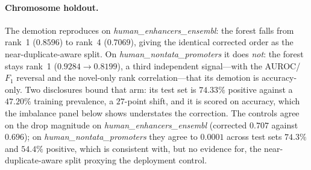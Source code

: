 \documentclass[11pt,a4paper]{article}
\begin{document}
\paragraph{Chromosome holdout.} The demotion reproduces on \textit{human\_enhancers\_ensembl}: the forest falls from rank~1 ($0.8596$) to rank~4 ($0.7069$), giving the identical corrected order as the near-duplicate-aware split. On \textit{human\_nontata\_promoters} it does \emph{not}: the forest stays rank~1 ($0.9284\to0.8199$), a third independent signal---with the AUROC/$F_1$ reversal and the novel-only rank correlation---that its demotion is accuracy-only. Two disclosures bound that arm: its test set is $74.33\%$ positive against a $47.20\%$ training prevalence, a $27$-point shift, and it is scored on accuracy, which the imbalance panel below shows understates the correction. The controls agree on the drop magnitude on \textit{human\_enhancers\_ensembl} (corrected $0.707$ against $0.696$); on \textit{human\_nontata\_promoters} they agree to $0.0001$ across test sets $74.3\%$ and $54.4\%$ positive, which is consistent with, but no evidence for, the near-duplicate-aware split proxying the deployment control.
\end{document}
